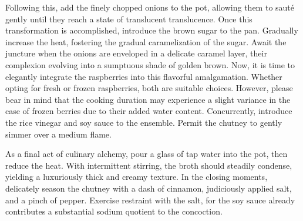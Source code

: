 Following this, add the finely chopped onions to the pot, allowing them to sauté gently until they reach a state of translucent translucence. Once this transformation is accomplished, introduce the brown sugar to the pan. Gradually increase the heat, fostering the gradual caramelization of the sugar. Await the juncture when the onions are enveloped in a delicate caramel layer, their complexion evolving into a sumptuous shade of golden brown. Now, it is time to elegantly integrate the raspberries into this flavorful amalgamation. Whether opting for fresh or frozen raspberries, both are suitable choices. However, please bear in mind that the cooking duration may experience a slight variance in the case of frozen berries due to their added water content. Concurrently, introduce the rice vinegar and soy sauce to the ensemble. Permit the chutney to gently simmer over a medium flame.

As a final act of culinary alchemy, pour a glass of tap water into the pot, then reduce the heat. With intermittent stirring, the broth should steadily condense, yielding a luxuriously thick and creamy texture. In the closing moments, delicately season the chutney with a dash of cinnamon, judiciously applied salt, and a pinch of pepper. Exercise restraint with the salt, for the soy sauce already contributes a substantial sodium quotient to the concoction.